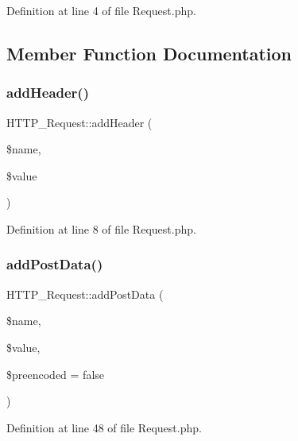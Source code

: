 Definition at line 4 of file Request.\+php.



\subsection{Member Function Documentation}
\hypertarget{classHTTP__Request_ad7ce4b414109089320151442d1aa23d3}{}\label{classHTTP__Request_ad7ce4b414109089320151442d1aa23d3} 
\subsubsection{\texorpdfstring{add\+Header()}{addHeader()}}
{\footnotesize\ttfamily H\+T\+T\+P\+\_\+\+Request\+::add\+Header (\begin{DoxyParamCaption}\item[{}]{\$name,  }\item[{}]{\$value }\end{DoxyParamCaption})}



Definition at line 8 of file Request.\+php.

\hypertarget{classHTTP__Request_a3b856946e8c0ccc2c84dac7c7e93bd9d}{}\label{classHTTP__Request_a3b856946e8c0ccc2c84dac7c7e93bd9d} 
\subsubsection{\texorpdfstring{add\+Post\+Data()}{addPostData()}}
{\footnotesize\ttfamily H\+T\+T\+P\+\_\+\+Request\+::add\+Post\+Data (\begin{DoxyParamCaption}\item[{}]{\$name,  }\item[{}]{\$value,  }\item[{}]{\$preencoded = {\ttfamily false} }\end{DoxyParamCaption})}



Definition at line 48 of file Request.\+php.

\hypertarget{classHTTP__Request_a8cf9237fc5a74cc2d797b64b7823db08}{}\label{classHTTP__Request_a8cf9237fc5a74cc2d797b64b7823db08} 
